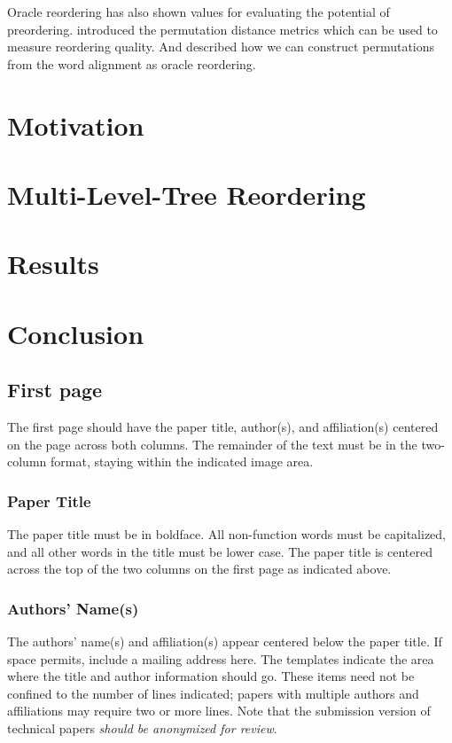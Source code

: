 \documentclass[a4paper]{article}
\begin{document}
Oracle reordering has also shown values for evaluating the potential of preordering. \cite{metrics} introduced the permutation distance metrics which can be used to measure reordering quality. And \cite{birch2} described how we can construct permutations from the word alignment as oracle reordering.

\section{Motivation}

\section{Multi-Level-Tree Reordering}

\section{Results}

\section{Conclusion}

\subsection{First page}

The first page should have the paper title, author(s), and affiliation(s)
centered on the page across both columns. The remainder of the text 
must be in the two-column format, staying within the indicated image 
area. 

\subsubsection{Paper Title}
The paper title must be in boldface. All non-function words must be capitalized,
and all other words in the title must be lower case. The paper title is centered
across the top of the two columns on the first page as indicated above.

\subsubsection{Authors' Name(s)}
The authors' name(s) and affiliation(s) appear centered below the paper
title. If space permits, include a mailing address here. The templates indicate
the area where the title and author information should go. These items need not
be confined to the number of lines indicated; papers with multiple
authors and affiliations may require two or more lines. 
Note that the submission version of technical papers \emph{should be 
anonymized for review}. 
\end{document}
